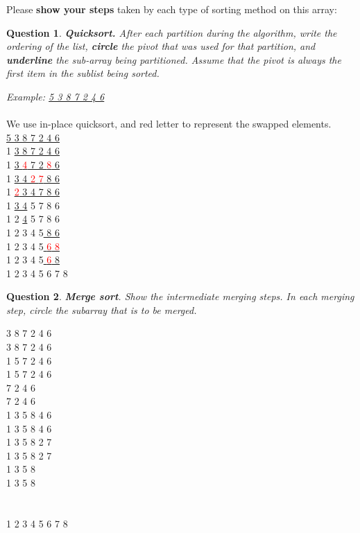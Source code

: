 \documentclass[10.5pt]{article}
\newcommand{\redtext}[1]{\textcolor{red}{#1}}
\newtheorem{Q}{Question}
\begin{document}
Please \textbf{show your steps} taken by each type of sorting method on this array:
\begin{Q} \textbf{Quicksort.}
After each partition during the algorithm, write the ordering of the list, \textbf{circle} the pivot that was used for that partition, and \textbf{underline} the sub-array being partitioned. Assume that the pivot is always the first item in the sublist being sorted.
\end{Q}
\textit{Example: \underline{ 5 3 8 7 2 4 6}}\\
\\
We use in-place quicksort, and red letter to represent the swapped elements.\\
\underline{ 5 3 8 7 2 4 6}\\
1 \underline{ 3 8 7 2 4 6}\\
1 \underline{ 3 \redtext{4} 7 2 \redtext{8} 6 }\\
1 \underline{ 3 4 \redtext{2} \redtext{7} 8 6 }\\
1 \underline{\redtext{2} 3 4 \boxed{\redtext{5}} 7 8 6 }\\
1 \underline{ 3 4} 5 7 8 6 \\
1 2 \underline{ 4} 5 7 8 6 \\
1 2 3 4 5\underline{ 8 6 }\\
1 2 3 4 5\underline{ \redtext{6} \redtext{8} }\\
1 2 3 4 5\underline{ \redtext{6} \boxed{\redtext{7}} 8}\\
1 2 3 4 5 6 7 8\\

\begin{Q}\textbf{Merge sort}. Show the intermediate merging steps. In each merging step, circle the subarray that is to be merged.
\end{Q}
 3 8 7 2 4 6\\
 3 8 7 2 4 6\\
1 5  7 2 4 6\\
1 5  7 2 4 6\\
 7 2 4 6\\
 7 2 4 6\\
1 3 5 8  4 6\\
1 3 5 8  4 6\\
1 3 5 8 2 7 \\
1 3 5 8 2 7 \\
1 3 5 8 \\
1 3 5 8 \\
\\
\\
1 2 3 4 5 6 7 8
\pagebreak
	
\end{document}
